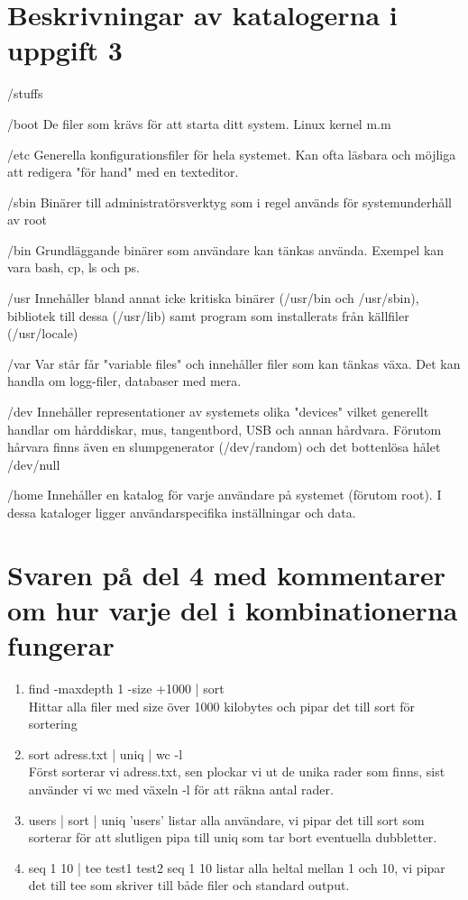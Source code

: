 \documentclass[11pt]{article}
\begin{document}
\section{Beskrivningar av katalogerna i uppgift 3}
\begin{labeling}{/stuffs}
\item [/boot] De filer som krävs för att starta ditt system. Linux kernel m.m
\item [/etc] Generella konfigurationsfiler för hela systemet. Kan ofta läsbara och möjliga att redigera "för hand" med en texteditor.
\item [/sbin] Binärer till administratörsverktyg som i regel används för systemunderhåll av root
\item [/bin] Grundläggande binärer som användare kan tänkas använda. Exempel kan vara bash, cp, ls och ps.
\item [/usr] Innehåller bland annat icke kritiska binärer (/usr/bin och /usr/sbin), bibliotek till dessa (/usr/lib) samt program som installerats från källfiler (/usr/locale)
\item [/var] Var står får "variable files" och innehåller filer som kan tänkas växa. Det kan handla om logg-filer, databaser med mera.
\item [/dev] Innehåller representationer av systemets olika "devices" vilket generellt handlar om hårddiskar, mus, tangentbord, USB och annan hårdvara. Förutom hårvara finns även en slumpgenerator (/dev/random) och det bottenlösa hålet /dev/null
\item [/home] Innehåller en katalog för varje användare på systemet (förutom root). I dessa kataloger ligger användarspecifika inställningar och data.
\end{labeling}

\section{Svaren på del 4 med kommentarer om hur varje del i kombinationerna fungerar}
\begin{enumerate}[label=(\alph*)]
\item find -maxdepth 1 -size  +1000 | sort \\
Hittar alla filer med size över 1000 kilobytes och pipar det till sort för sortering
\item sort adress.txt | uniq | wc -l \\
Först sorterar vi adress.txt, sen plockar vi ut de unika rader som finns, sist använder vi wc med växeln -l för att räkna antal rader.
\item users | sort | uniq
'users' listar alla användare, vi pipar det till sort som sorterar för att slutligen pipa till uniq som tar bort eventuella dubbletter.
\item seq 1 10 | tee test1 test2
seq 1 10 listar alla heltal mellan 1 och 10, vi pipar det till tee som skriver till både filer och standard output.
\end{enumerate}
\end{document}
